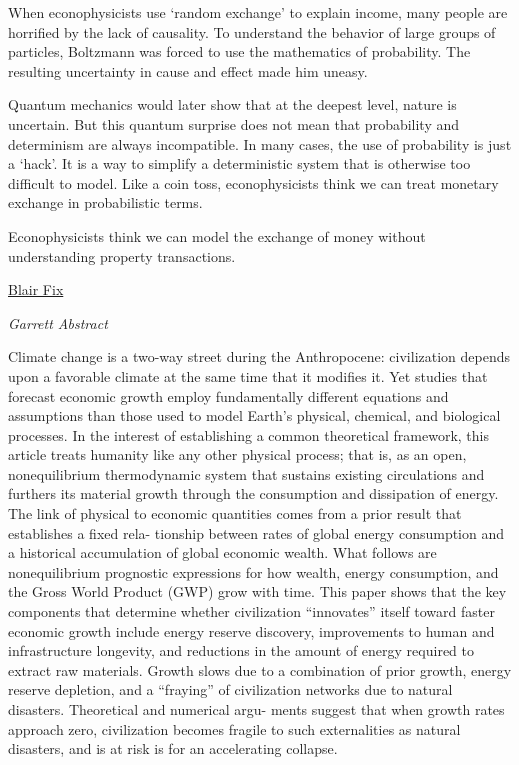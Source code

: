 \documentclass[
]{book}
\begin{document}
When econophysicists use `random exchange' to explain income,
many people are horrified by the lack of causality.
To understand the behavior of large groups of particles,
Boltzmann was forced to use the mathematics of probability.
The resulting uncertainty in cause and effect made him uneasy.

Quantum mechanics would later show that at the deepest level, nature is uncertain.
But this quantum surprise does not mean that probability and determinism are always incompatible.
In many cases, the use of probability is just a `hack'.
It is a way to simplify a deterministic system that is otherwise too difficult to model.
Like a coin toss, econophysicists think we can treat monetary exchange in probabilistic terms.

Econophysicists think we can model the exchange of money without understanding property transactions.

\href{https://economicsfromthetopdown.com/2021/03/12/energizing-exchange-learning-from-econophysics-mistakes/}{Blair Fix}

\emph{Garrett Abstract}

Climate change is a two-way street during the Anthropocene: civilization depends upon a
favorable climate at the same time that it modiﬁes it. Yet studies that forecast economic growth employ
fundamentally diﬀerent equations and assumptions than those used to model Earth's physical, chemical,
and biological processes. In the interest of establishing a common theoretical framework, this article treats
humanity like any other physical process; that is, as an open, nonequilibrium thermodynamic system that
sustains existing circulations and furthers its material growth through the consumption and dissipation of
energy. The link of physical to economic quantities comes from a prior result that establishes a ﬁxed rela-
tionship between rates of global energy consumption and a historical accumulation of global economic
wealth. What follows are nonequilibrium prognostic expressions for how wealth, energy consumption,
and the Gross World Product (GWP) grow with time. This paper shows that the key components that
determine whether civilization ``innovates'' itself toward faster economic growth include energy reserve
discovery, improvements to human and infrastructure longevity, and reductions in the amount of energy
required to extract raw materials. Growth slows due to a combination of prior growth, energy reserve
depletion, and a ``fraying'' of civilization networks due to natural disasters. Theoretical and numerical argu-
ments suggest that when growth rates approach zero, civilization becomes fragile to such externalities as
natural disasters, and is at risk is for an accelerating collapse.
\end{document}
